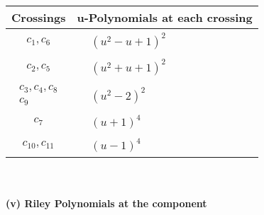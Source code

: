 \documentclass[1p]{elsarticle_modified}
\theoremstyle{definition}
\begin{document}
\begin{tabular}{m{50pt}|m{274pt}}
Crossings & \hspace{64pt}u-Polynomials at each crossing \\
\hline $$\begin{aligned}c_{1},c_{6}\end{aligned}$$&$\begin{aligned}
&(u^2- u+1)^2
\end{aligned}$\\
\hline $$\begin{aligned}c_{2},c_{5}\end{aligned}$$&$\begin{aligned}
&(u^2+u+1)^2
\end{aligned}$\\
\hline $$\begin{aligned}c_{3},c_{4},c_{8}\\c_{9}\end{aligned}$$&$\begin{aligned}
&(u^2-2)^2
\end{aligned}$\\
\hline $$\begin{aligned}c_{7}\end{aligned}$$&$\begin{aligned}
&(u+1)^4
\end{aligned}$\\
\hline $$\begin{aligned}c_{10},c_{11}\end{aligned}$$&$\begin{aligned}
&(u-1)^4
\end{aligned}$\\
\hline
\end{tabular}\\~\\
\newpage\renewcommand{\arraystretch}{1}
\flushleft \textbf{(v) Riley Polynomials at the component}\newline \\
\end{document}
